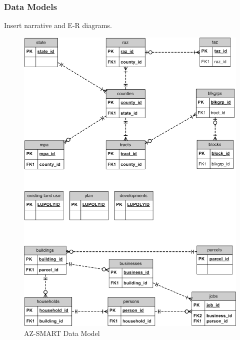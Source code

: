\subsubsection{Data Models}
Insert narrative and E-R diagrams.



\begin{figure}[h]
\begin{center}
\includegraphics[scale=0.5]{figures/AZ-SMART_data_model_diagram.png}
\caption{AZ-SMART Data Model}
\end{center}
\end{figure}